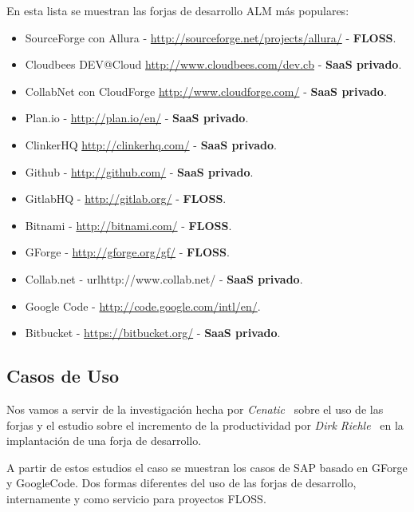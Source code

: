 \par En esta lista se muestran las forjas de desarrollo ALM más populares:

\begin{itemize}
	\item SourceForge con Allura - \url{http://sourceforge.net/projects/allura/} - \textbf{FLOSS}.
	\item Cloudbees DEV@Cloud \url{http://www.cloudbees.com/dev.cb} - \textbf{SaaS privado}.
	\item CollabNet con CloudForge \url{http://www.cloudforge.com/} - \textbf{SaaS privado}.
	\item Plan.io - \url{http://plan.io/en/} - \textbf{SaaS privado}.
	\item ClinkerHQ \url{http://clinkerhq.com/} - \textbf{SaaS privado}.
	\item Github - \url{http://github.com/} - \textbf{SaaS privado}.
    \item GitlabHQ - \url{http://gitlab.org/} - \textbf{FLOSS}.
	\item Bitnami - \url{http://bitnami.com/} - \textbf{FLOSS}.
	\item GForge - \url{http://gforge.org/gf/} - \textbf{FLOSS}.
	\item Collab.net - url{http://www.collab.net/} - \textbf{SaaS privado}.
	\item Google Code - \url{http://code.google.com/intl/en/}.
	\item Bitbucket - \url{https://bitbucket.org/} - \textbf{SaaS privado}.
\end{itemize}


\subsection{Casos de Uso}
\label{sub:casos-de-uso}

\par Nos vamos a servir de la investigación hecha por \emph{Cenatic}~\cite{cenatic-forjas} sobre el uso de las forjas y el estudio sobre el incremento de la productividad por \emph{Dirk Riehle}~\cite{open-collaboration-forges} en la implantación de una forja de desarrollo.

\par A partir de estos estudios el caso se muestran los casos de SAP basado en GForge y GoogleCode. Dos formas diferentes del uso de las forjas de desarrollo, internamente y como servicio para proyectos FLOSS.

